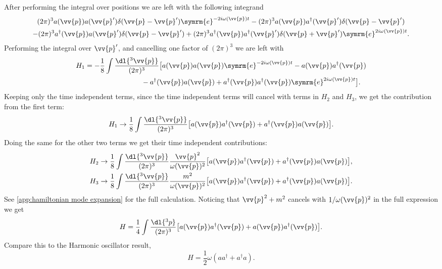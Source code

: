 \documentclass[fleqn]{NotesClass}
\newcommand{\e}{\symrm{e}}
\newcommand{\hermit}{{\dagger}}
\begin{document}
    After performing the integral over positions we are left with the following integrand
    \begin{multline*}
        (2\pi)^3 a(\vv{p}) a(\vv{p}') \delta(\vv{p} - \vv{p}')\e^{-2i\omega(\vv{p})t} - (2\pi)^3 a(\vv{p}) a^\hermit(\vv{p}') \delta(\vv{p} - \vv{p}')\\
        - (2\pi)^3a^\hermit(\vv{p})a(\vv{p}')\delta(\vv{p} - \vv{p}') + (2\pi)^3a^\hermit(\vv{p}) a^\hermit(\vv{p}') \delta(\vv{p} + \vv{p}') \e^{2i\omega(\vv{p})t}.
    \end{multline*}
    Performing the integral over \(\vv{p}'\), and cancelling one factor of \((2\pi)^3\) we are left with
    \begin{align}
        H_1 &= -\frac{1}{8} \int \frac{\dl{^3\vv{p}}}{(2\pi)^3} \big[ a(\vv{p}) a(\vv{p}) \e^{-2i\omega(\vv{p})t}  - a(\vv{p}) a^\hermit(\vv{p})\\
        &\qquad\qquad\qquad\qquad- a^\hermit(\vv{p}) a(\vv{p}) + a^\hermit(\vv{p})a^\hermit(\vv{p}) \e^{2i\omega(\vv{p})t} \big].\notag
    \end{align}
    Keeping only the time independent terms, since the time independent terms will cancel with terms in \(H_2\) and \(H_3\), we get the contribution from the first term:
    \begin{equation}
        H_1 \to \frac{1}{8} \int \frac{\dl{^3\vv{p}}}{(2\pi)^3} \big[ a(\vv{p}) a^\hermit(\vv{p})+ a^\hermit(\vv{p}) a(\vv{p}) \big].
    \end{equation}
    Doing the same for the other two terms we get their time independent contributions:
    \begin{align}
        H_2 &\to \frac{1}{8} \int \frac{\dl{^3\vv{p}}}{(2\pi)^3} \frac{\vv{p}^2}{\omega(\vv{p})^2} \big[ a(\vv{p}) a^\hermit(\vv{p}) + a^\hermit(\vv{p}) a(\vv{p}) \big],\\
        H_3 &\to \frac{1}{8} \int \frac{\dl{^3\vv{p}}}{(2\pi)^3} \frac{m^2}{\omega(\vv{p})^2} \big[ a(\vv{p}) a^\hermit(\vv{p}) + a^\hermit(\vv{p}) a(\vv{p}) \big].
    \end{align}
    See \cref{app:hamiltonian mode expansion} for the full calculation.
    Noticing that \(\vv{p}^2 + m^2\) cancels with \(1/\omega(\vv{p})^2\) in the full expression we get
    \begin{equation}
        H = \frac{1}{4} \int \frac{\dl{^3p}}{(2\pi)^3} \big[ a(\vv{p})a^\hermit(\vv{p}) + a(\vv{p})a^\hermit(\vv{p}) \big].
    \end{equation}
    Compare this to the Harmonic oscillator result,
    \begin{equation}
        H = \frac{1}{2}\omega(aa^\hermit + a^\hermit a).
    \end{equation}
    
\end{document}
